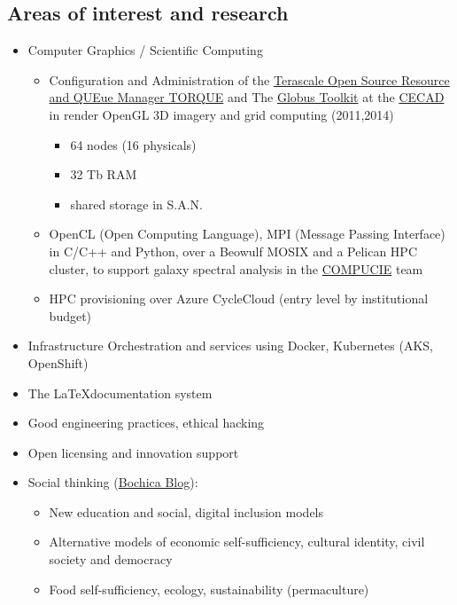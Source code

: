 \documentclass[overlapped,line,final]{res}
\begin{document}
\begin{resume}
\section{\sc Areas of interest and research}
\vspace{0.5cm}
\begin{itemize}
	\item Computer Graphics / Scientific Computing
	\begin{itemize}
		\item Configuration and Administration of the \href {https://github.com/adaptivecomputing/torque}{Terascale Open Source Resource and QUEue Manager TORQUE} and The \href{https://toolkit.globus.org/}{Globus Toolkit} at the \href{https://cecad.udistrital.edu.co/}{CECAD} in render OpenGL 3D imagery and grid computing (2011,2014)
	 \begin{itemize}
	  \item 64 nodes (16 physicals)
	  \item 32 Tb RAM
	  \item shared storage in S.A.N.
	 \end{itemize}
 \item OpenCL (Open Computing Language), MPI (Message Passing Interface) in C\slash C++ and Python, over a Beowulf MOSIX and a Pelican HPC cluster, to support galaxy spectral analysis in the \href{http://chronos.udistrital.edu.co:8095/siciud/web/Consultas.x?accion=5&idSemillero=2382}{COMPUCIE} team 
	 \item HPC provisioning over Azure CycleCloud (entry level by institutional budget)
	\end{itemize}
	\item Infrastructure Orchestration and services using Docker, Kubernetes (AKS, OpenShift)
	\item The \LaTeX documentation system	
    	\item Good engineering practices, ethical hacking
	\item Open licensing and innovation support
	\item Social thinking (\href {https://bochica.org}{Bochica Blog}):
    	\begin{itemize}
		\item New education and social, digital inclusion models
		\item Alternative models of economic self-sufficiency, cultural identity, civil society and democracy
		\item Food self-sufficiency, ecology, sustainability (permaculture)
    	\end{itemize}


\end{itemize}
\end{resume}
\end{document}
